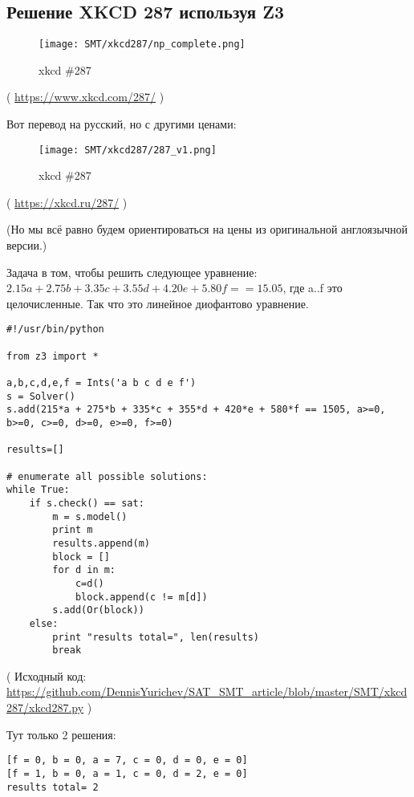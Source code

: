 \subsection{Решение XKCD 287 используя Z3}

\begin{figure}[H]
\centering
\texttt{[image: SMT/xkcd287/np\_complete.png]}
\caption{xkcd \#287}
\end{figure}

( \url{https://www.xkcd.com/287/} )

Вот перевод на русский, но с другими ценами:

\begin{figure}[H]
\centering
\texttt{[image: SMT/xkcd287/287\_v1.png]}
\caption{xkcd \#287}
\end{figure}

( \url{https://xkcd.ru/287/} )

(Но мы всё равно будем ориентироваться на цены из оригинальной англоязычной версии.)

Задача в том, чтобы решить следующее уравнение:
$2.15a + 2.75b + 3.35c + 3.55d + 4.20e + 5.80f == 15.05$,
где a..f это целочисленные.
Так что это линейное диофантово уравнение.

\begin{lstlisting}
#!/usr/bin/python

from z3 import *

a,b,c,d,e,f = Ints('a b c d e f')
s = Solver()
s.add(215*a + 275*b + 335*c + 355*d + 420*e + 580*f == 1505, a>=0, b>=0, c>=0, d>=0, e>=0, f>=0)

results=[]

# enumerate all possible solutions:
while True:
    if s.check() == sat:
        m = s.model()
        print m
        results.append(m)
        block = []
        for d in m:
            c=d()
            block.append(c != m[d])
        s.add(Or(block))
    else:
        print "results total=", len(results)
        break
\end{lstlisting}

( Исходный код: \url{https://github.com/DennisYurichev/SAT_SMT_article/blob/master/SMT/xkcd287/xkcd287.py} )

Тут только 2 решения:

\begin{lstlisting}
[f = 0, b = 0, a = 7, c = 0, d = 0, e = 0]
[f = 1, b = 0, a = 1, c = 0, d = 2, e = 0]
results total= 2
\end{lstlisting}

